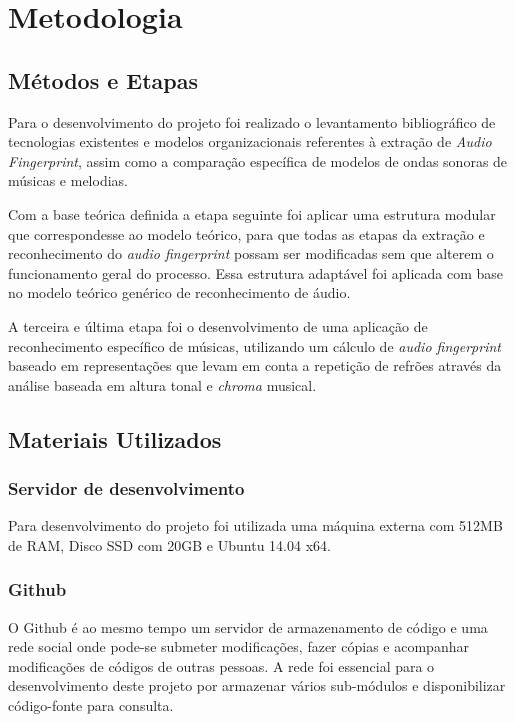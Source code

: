 \chapter{Metodologia}
\label{c.metodologia}

\section{Métodos e Etapas}
\label{s.metodoseetapas}

Para o desenvolvimento do projeto foi realizado o levantamento bibliográfico de tecnologias existentes e modelos organizacionais referentes à extração de \emph{Audio Fingerprint}, assim como a comparação específica de modelos de ondas sonoras de músicas e melodias.

Com a base teórica definida a etapa seguinte foi aplicar uma estrutura modular que correspondesse ao modelo teórico, para que todas as etapas da extração e reconhecimento do \emph{audio fingerprint} possam ser modificadas sem que alterem o funcionamento geral do processo. Essa estrutura adaptável foi aplicada com base no modelo teórico genérico de reconhecimento de áudio.

A terceira e última etapa foi o desenvolvimento de uma aplicação de reconhecimento específico de músicas, utilizando um cálculo de \emph{audio fingerprint} baseado em representações que levam em conta a repetição de refrões através da análise baseada em altura tonal e \emph{chroma} musical.

\section{Materiais Utilizados}
\label{s.materiaisutilizados}


\subsection{Servidor de desenvolvimento}
\label{s.v8}

Para desenvolvimento do projeto foi utilizada uma máquina externa com 512MB de RAM, Disco SSD com 20GB e Ubuntu 14.04 x64.

\subsection{Github}
\label{s.github}

O Github é ao mesmo tempo um servidor de armazenamento de código e uma rede social onde pode-se submeter modificações, fazer cópias e acompanhar modificações de códigos de outras pessoas. A rede foi essencial para o desenvolvimento deste projeto por armazenar vários sub-módulos e disponibilizar código-fonte para consulta.

